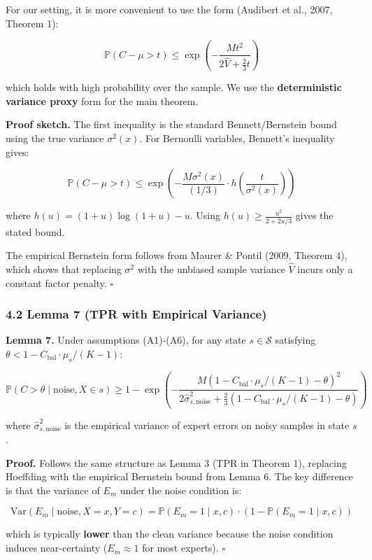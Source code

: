 \documentclass[
  12pt,
]{ctexart}
\begin{document}
For our setting, it is more convenient to use the form (Audibert et al.,
2007, Theorem 1):

\[\mathbb{P}\!\left(C - \mu > t\right) \leq \exp\!\left(-\frac{M t^2}{2\hat{V} + \frac{2}{3}t}\right)\]

which holds with high probability over the sample. We use the
\textbf{deterministic variance proxy} form for the main theorem.

\textbf{Proof sketch.} The first inequality is the standard
Bennett/Bernstein bound using the true variance \(\sigma^2(x)\). For
Bernoulli variables, Bennett's inequality gives:

\[\mathbb{P}(C - \mu > t) \leq \exp\!\left(-\frac{M \sigma^2(x)}{(1/3)} \cdot h\!\left(\frac{t}{\sigma^2(x)}\right)\right)\]

where \(h(u) = (1+u)\log(1+u) - u\). Using
\(h(u) \geq \frac{u^2}{2 + 2u/3}\) gives the stated bound.

The empirical Bernstein form follows from Maurer \& Pontil (2009,
Theorem 4), which shows that replacing \(\sigma^2\) with the unbiased
sample variance \(\hat{V}\) incurs only a constant factor penalty.
\(\square\)

\subsubsection{4.2 Lemma 7 (TPR with Empirical
Variance)}\label{lemma-7-tpr-with-empirical-variance}

\textbf{Lemma 7.} Under assumptions (A1)-(A6), for any state
\(s \in \mathcal{S}\) satisfying
\(\theta < 1 - C_{\text{bal}} \cdot \mu_s/(K-1)\):

\[\mathbb{P}(C > \theta \mid \text{noise}, X \in s) \geq 1 - \exp\!\left(-\frac{M(1 - C_{\text{bal}} \cdot \mu_s/(K-1) - \theta)^2}{2\hat{\sigma}_{s,\text{noise}}^2 + \frac{2}{3}(1 - C_{\text{bal}} \cdot \mu_s/(K-1) - \theta)}\right)\]

where \(\hat{\sigma}_{s,\text{noise}}^2\) is the empirical variance of
expert errors on noisy samples in state \(s\).

\textbf{Proof.} Follows the same structure as Lemma 3 (TPR in Theorem
1), replacing Hoeffding with the empirical Bernstein bound from Lemma 6.
The key difference is that the variance of \(E_m\) under the noise
condition is:

\[\text{Var}(E_m \mid \text{noise}, X = x, Y = c) = \mathbb{P}(E_m = 1 \mid x, c) \cdot (1 - \mathbb{P}(E_m = 1 \mid x, c))\]

which is typically \textbf{lower} than the clean variance because the
noise condition induces near-certainty (\(E_m \approx 1\) for most
experts). \(\square\)
\end{document}
